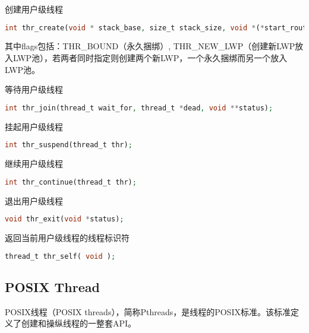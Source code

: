 \begin{compactitem}
\item 创建用户级线程

\begin{lstlisting}[language=PHP]
int thr_create(void * stack_base, size_t stack_size, void *(*start_routine，void *), void * arg, long flags, thread_t * new_thr);
\end{lstlisting}

其中flags包括：THR\_BOUND（永久捆绑）, THR\_NEW\_LWP（创建新LWP放入LWP池），若两者同时指定则创建两个新LWP，一个永久捆绑而另一个放入LWP池。

\item 等待用户级线程

\begin{lstlisting}[language=PHP]
int thr_join(thread_t wait_for, thread_t *dead, void **status);
\end{lstlisting}

\item 挂起用户级线程

\begin{lstlisting}[language=PHP]
int thr_suspend(thread_t thr);
\end{lstlisting}

\item 继续用户级线程

\begin{lstlisting}[language=PHP]
int thr_continue(thread_t thr);
\end{lstlisting}

\item 退出用户级线程

\begin{lstlisting}[language=PHP]
void thr_exit(void *status);
\end{lstlisting}

\item 返回当前用户级线程的线程标识符

\begin{lstlisting}[language=PHP]
thread_t thr_self( void );
\end{lstlisting}

\end{compactitem}

\subsection{POSIX Thread}

POSIX线程（POSIX threads），简称Pthreads，是线程的POSIX标准。该标准定义了创建和操纵线程的一整套API。


